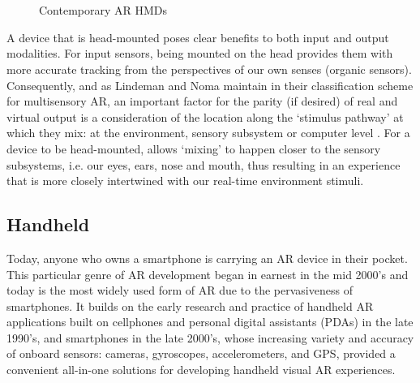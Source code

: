 \begin{figure}
    \centering
    \quad
    \hfill
    \\
    \vspace{0.5cm}
    \quad
    \hfill
    \\
    \caption{Contemporary AR HMDs}
    \label{fig: contemporaryHMDs}
\end{figure}

A device that is head-mounted poses clear benefits to both input and output modalities. For input sensors, being mounted on the head provides them with more accurate tracking from the perspectives of our own senses (organic sensors).  Consequently, and as Lindeman and Noma maintain in their classification scheme for multisensory AR, an important factor for the parity (if desired) of real and virtual output is a consideration of the location along the `stimulus pathway' at which they mix: at the environment, sensory subsystem or computer level \citeyearpar{lindeman2007}. For a device to be head-mounted, allows `mixing' to happen closer to the sensory subsystems, i.e. our eyes, ears, nose and mouth, thus resulting in an experience that is more closely intertwined with our real-time environment stimuli.

\subsection{Handheld}\label{sec: ar-forms-mobile}
Today, anyone who owns a smartphone is carrying an AR device in their pocket. This particular genre of AR development began in earnest in the mid 2000's and today is the most widely used form of AR due to the pervasiveness of smartphones. It builds on the early research and practice of handheld AR applications built on cellphones and personal digital assistants (PDAs) in the late 1990's, and smartphones in the late 2000’s, whose increasing variety and accuracy of onboard sensors: cameras, gyroscopes, accelerometers, and GPS, provided a convenient all-in-one solutions for developing handheld visual AR experiences. 

